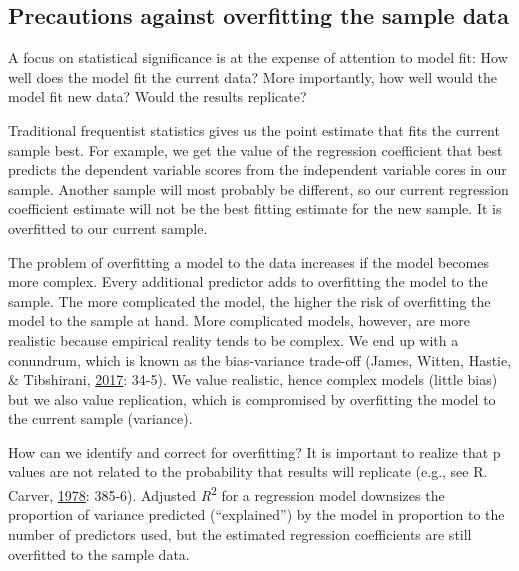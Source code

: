 \documentclass[doc]{apa6}
\begin{document}
\subsection{Precautions against overfitting the sample
data}\label{precautions-against-overfitting-the-sample-data}

A focus on statistical significance is at the expense of attention to
model fit: How well does the model fit the current data? More
importantly, how well would the model fit new data? Would the results
replicate?

Traditional frequentist statistics gives us the point estimate that fits
the current sample best. For example, we get the value of the regression
coefficient that best predicts the dependent variable scores from the
independent variable cores in our sample. Another sample will most
probably be different, so our current regression coefficient estimate
will not be the best fitting estimate for the new sample. It is
overfitted to our current sample.

The problem of overfitting a model to the data increases if the model
becomes more complex. Every additional predictor adds to overfitting the
model to the sample. The more complicated the model, the higher the risk
of overfitting the model to the sample at hand. More complicated models,
however, are more realistic because empirical reality tends to be
complex. We end up with a conundrum, which is known as the bias-variance
trade-off (James, Witten, Hastie, \& Tibshirani,
\protect\hyperlink{ref-JamesIntroductionStatisticalLearning2017}{2017}:
34-5). We value realistic, hence complex models (little bias) but we
also value replication, which is compromised by overfitting the model to
the current sample (variance).

How can we identify and correct for overfitting? It is important to
realize that p values are not related to the probability that results
will replicate (e.g., see R. Carver,
\protect\hyperlink{ref-carverCaseStatisticalSignificance1978}{1978}:
385-6). Adjusted \emph{R}\textsuperscript{2} for a regression model
downsizes the proportion of variance predicted (\enquote{explained}) by
the model in proportion to the number of predictors used, but the
estimated regression coefficients are still overfitted to the sample
data.
\end{document}
